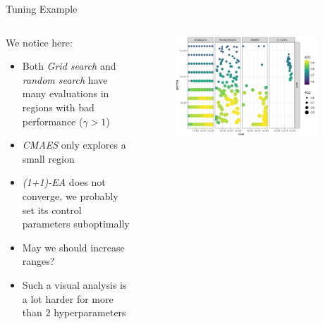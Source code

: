 \begin{frame}{Tuning Example}

\begin{columns}
\begin{column}{0.45\textwidth}
  \vspace{1em}

  We notice here:

  \begin{itemize}
      \item Both \emph{Grid search} and \emph{random search} have many evaluations in regions with bad performance ($\gamma>1$)
      \item \emph{CMAES} only explores a small region
      \item \emph{(1+1)-EA} does not converge, we probably set its control parameters suboptimally
      \item May we should increase ranges?
      \item Such a visual analysis is a lot harder for more than 2 hyperparameters
  \end{itemize}
\end{column}%
\begin{column}{0.5\textwidth}
  \vspace{-1em}
  \begin{figure}
  \includegraphics[width=0.9\textwidth]{images/benchmark_scatter.png}
  \end{figure}
\end{column}
\end{columns}

\end{frame}
